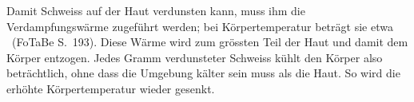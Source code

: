 Damit Schweiss auf der Haut verdunsten kann, muss ihm die Verdampfungswärme zugeführt werden; bei Körpertemperatur beträgt sie etwa \LvWO\ (FoTaBe S.~193). Diese Wärme wird zum grössten Teil der Haut und damit dem Körper entzogen. Jedes Gramm verdunsteter Schweiss kühlt den Körper also beträchtlich, ohne dass die Umgebung kälter sein muss als die Haut. So wird die erhöhte Körpertemperatur wieder gesenkt.
